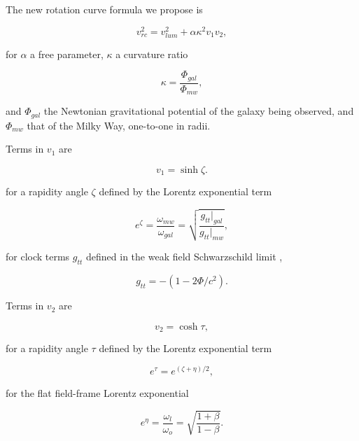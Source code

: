 \documentclass[reprint,%
 amsmath,amssymb,
 aps,
]{revtex4-1}
\begin{document}
   The new rotation curve formula we propose  is
   

\begin{equation}
v_{rc}^2 =  v_{lum}^2+\alpha \kappa^2 v_{1} v_{2},  
\label{eq:zonteLCM}
\end{equation}  

for $\alpha$  a free parameter,  
$\kappa$  a curvature ratio 

 \begin{equation}
\kappa=\frac{\Phi_{gal}}{\Phi_{mw}}, 
\label{eq:kappa2}  
\end{equation}  

 and $\Phi_{gal}$ the    Newtonian gravitational potential of the galaxy being observed, and $\Phi_{mw}$ that of  the Milky Way, one-to-one in radii. 


 Terms in $v_1$   are   
 
   \begin{equation}
       v_1 = \sinh \zeta. 
   \end{equation}
 
 for a rapidity angle $\zeta$ defined by the    Lorentz exponential  term  
  
   
     \begin{equation}
     e^{\zeta}=  \frac{\omega_{mw}}{\omega_{gal}}  =\sqrt{\frac{g_{tt}|_{gal}}{g_{tt}|_{mw}}},
      \label{eq:gravRS}
    \end{equation}
    
 for  clock terms $g_{tt}$   defined in the   weak field Schwarzschild limit  \cite{Hartle}, 
 
  \begin{equation}
      g_{tt}= -( 1 - 2\Phi/ c^2).
      \label{clocktime}
  \end{equation} 
  

Terms in $v_2$ are 

\begin{equation}
v_{2} =  \cosh \tau, 
\label{eq:hyperbolico}
\end{equation}


 
 
  for a rapidity angle $\tau$ defined by the    Lorentz exponential  term  
  
 
\begin{equation}
    e^{\tau}=   e^{(\zeta+\eta)/2},
\end{equation}
 
for the  flat field-frame
Lorentz exponential  

\begin{equation}
    e^{\eta}=\frac{\omega_{l}}{\omega_o}= \sqrt{\frac{1+\beta}{1-\beta}}.   
    \label{eq:flat}
\end{equation}  
     
\end{document}

